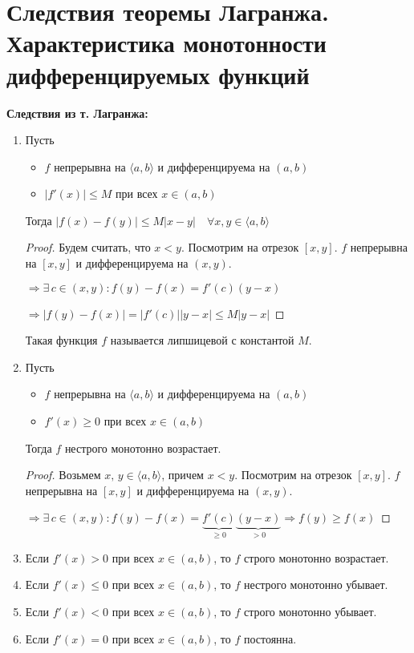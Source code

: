 \section{Следствия теоремы Лагранжа. Характеристика монотонности дифференцируемых функций}
\textbf{Следствия из т. Лагранжа:}
\begin{enumerate}
    \item Пусть
    \begin{itemize}
        \item $f$ непрерывна на $\langle a, b \rangle$ и дифференцируема на $(a, b)$
        \item $|f'(x)| \leqslant M$ при всех $x \in (a, b)$
    \end{itemize}
    Тогда $|f(x) - f(y)| \leqslant M|x - y| \quad \forall x, y \in \langle a, b \rangle$
    \begin{proof}
        Будем считать, что $x < y$. Посмотрим на отрезок $[x, y]$. $f$ непрерывна на $[x, y]$ и дифференцируема на $(x, y)$. 

        $\Rightarrow \exists \, c \in (x, y) : f(y) - f(x) = f'(c)(y - x)$

        $\Rightarrow |f(y) - f(x)| = |f'(c)||y - x| \leqslant M|y - x|$
    \end{proof}
    \begin{notice}
        Такая функция $f$ называется липшицевой с константой $M$.
    \end{notice}
    \item Пусть
    \begin{itemize}
        \item $f$ непрерывна на $\langle a, b \rangle$ и дифференцируема на $(a, b)$
        \item $f'(x) \geqslant 0$ при всех $x \in (a, b)$
    \end{itemize}
    Тогда $f$ нестрого монотонно возрастает.
    \begin{proof}
        Возьмем $x, \, y \in \langle a, b \rangle$, причем $x < y$. 
        Посмотрим на отрезок $[x, y]$. $f$ непрерывна на $[x, y]$ и дифференцируема на $(x, y)$. 

        $\Rightarrow \exists \, c \in (x, y) : f(y) - f(x) = \underbrace{f'(c)}_{\geqslant 0}\underbrace{(y - x)}_{> 0} \Rightarrow f(y) \geqslant f(x)$
    \end{proof}
    \item Если $f'(x) > 0$ при всех $x \in (a, b)$, то $f$ строго монотонно возрастает.
    \item Если $f'(x) \leqslant 0$ при всех $x \in (a, b)$, то $f$ нестрого монотонно убывает.
    \item Если $f'(x) < 0$ при всех $x \in (a, b)$, то $f$ строго монотонно убывает.
    \item Если $f'(x) = 0$ при всех $x \in (a, b)$, то $f$ постоянна.
\end{enumerate}

